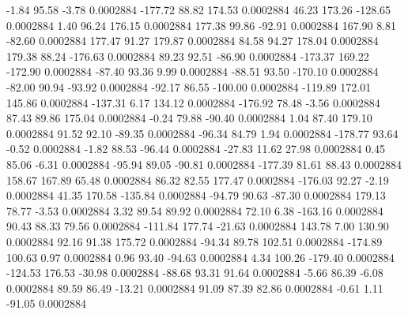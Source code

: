        -1.84       95.58       -3.78     0.0002884
     -177.72       88.82      174.53     0.0002884
       46.23      173.26     -128.65     0.0002884
        1.40       96.24      176.15     0.0002884
      177.38       99.86      -92.91     0.0002884
      167.90        8.81      -82.60     0.0002884
      177.47       91.27      179.87     0.0002884
       84.58       94.27      178.04     0.0002884
      179.38       88.24     -176.63     0.0002884
       89.23       92.51      -86.90     0.0002884
     -173.37      169.22     -172.90     0.0002884
      -87.40       93.36        9.99     0.0002884
      -88.51       93.50     -170.10     0.0002884
      -82.00       90.94      -93.92     0.0002884
      -92.17       86.55     -100.00     0.0002884
     -119.89      172.01      145.86     0.0002884
     -137.31        6.17      134.12     0.0002884
     -176.92       78.48       -3.56     0.0002884
       87.43       89.86      175.04     0.0002884
       -0.24       79.88      -90.40     0.0002884
        1.04       87.40      179.10     0.0002884
       91.52       92.10      -89.35     0.0002884
      -96.34       84.79        1.94     0.0002884
     -178.77       93.64       -0.52     0.0002884
       -1.82       88.53      -96.44     0.0002884
      -27.83       11.62       27.98     0.0002884
        0.45       85.06       -6.31     0.0002884
      -95.94       89.05      -90.81     0.0002884
     -177.39       81.61       88.43     0.0002884
      158.67      167.89       65.48     0.0002884
       86.32       82.55      177.47     0.0002884
     -176.03       92.27       -2.19     0.0002884
       41.35      170.58     -135.84     0.0002884
      -94.79       90.63      -87.30     0.0002884
      179.13       78.77       -3.53     0.0002884
        3.32       89.54       89.92     0.0002884
       72.10        6.38     -163.16     0.0002884
       90.43       88.33       79.56     0.0002884
     -111.84      177.74      -21.63     0.0002884
      143.78        7.00      130.90     0.0002884
       92.16       91.38      175.72     0.0002884
      -94.34       89.78      102.51     0.0002884
     -174.89      100.63        0.97     0.0002884
        0.96       93.40      -94.63     0.0002884
        4.34      100.26     -179.40     0.0002884
     -124.53      176.53      -30.98     0.0002884
      -88.68       93.31       91.64     0.0002884
       -5.66       86.39       -6.08     0.0002884
       89.59       86.49      -13.21     0.0002884
       91.09       87.39       82.86     0.0002884
       -0.61        1.11      -91.05     0.0002884
